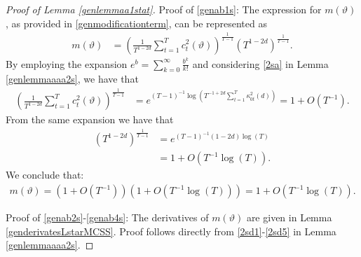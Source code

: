 {{\begin{proof}[Proof of Lemma \ref{genlemmaa1stat}]
Proof of \eqref{genab1s}: 
The expression for $m(\vartheta)$, as provided in \eqref{genmodificationterm}, can be represented as 
\begin{align*}
    m(\vartheta) &= \left( \frac{1}{T^{1-2d}} \sum_{t = 1}^T c^2_t(\vartheta)  \right)^{\frac{1}{T-1}} \left(T^{1-2d}  \right)^{\frac{1}{T-1}}.
\end{align*}
By employing the expansion $e^{b} = \sum_{k = 0}^{\infty} \frac{b^k}{k !}$ and considering \eqref{2sa} in Lemma \ref{genlemmaaaa2s}, we have that
\begin{align*}
    \left( \frac{1}{T^{1-2d}} \sum_{t = 1}^T c^2_t(\vartheta)  \right)^{\frac{1}{T-1}} &= e^{ (T-1)^{-1} \log \left( T^{-1+2d} \sum_{t = 1}^T \kappa^2_{0t}(d) \right) } =   1 + O(T^{-1}).
\end{align*}
From the same expansion we have that 
\begin{align*}
    \left(T^{1-2d}  \right)^{\frac{1}{T-1}} &= e^{ (T-1)^{-1} (1-2d)  \log(T) } \\
                                            &= 1+O(T^{-1}\log(T)).                            
\end{align*}
We conclude that: 
\begin{align*}
    m(\vartheta) = (1+O(T^{-1}))(1+O(T^{-1}\log(T)))  = 1+O(T^{-1}\log(T)).
\end{align*}

Proof of \eqref{genab2s}-\eqref{genab4s}:  The derivatives of $m(\vartheta)$ are given in Lemma \ref{genderivatesLstarMCSS}. Proof follows directly from \eqref{2sd1}-\eqref{2sd5} in Lemma \ref{genlemmaaaa2s}. 










\end{proof}






}}

